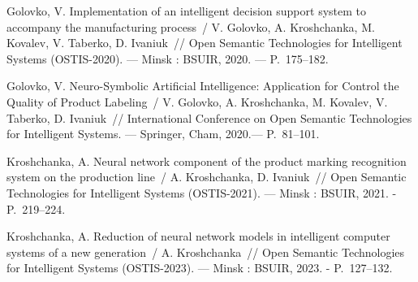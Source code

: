 Golovko, V. Implementation of an intelligent decision support system to accompany the manufacturing process~/ V. Golovko, A. Kroshchanka, M. Kovalev, V. Taberko, D. Ivaniuk~// 
 Open Semantic Technologies for Intelligent Systems (OSTIS-2020). ---
\newblock Minsk : BSUIR, 2020. ---
\newblock P.~175--182.

Golovko, V. Neuro-Symbolic Artificial Intelligence: Application for Control the Quality of Product Labeling~/ V. Golovko, A. Kroshchanka, M. Kovalev, V. Taberko, D. Ivaniuk~// 
 International Conference on Open Semantic Technologies for Intelligent Systems. ---
\newblock Springer, Cham, 2020.---
\newblock P.~81--101.

Kroshchanka, A. Neural network component of the product marking recognition system on the production line~/ A. Kroshchanka, D. Ivaniuk~// 
 Open Semantic Technologies for Intelligent Systems (OSTIS-2021). ---
\newblock Minsk : BSUIR, 2021. -
\newblock P.~219--224.



Kroshchanka, A. Reduction of neural network models in intelligent computer systems of a new generation~/ A. Kroshchanka~// 
 Open Semantic Technologies for Intelligent Systems (OSTIS-2023). ---
\newblock Minsk : BSUIR, 2023. -
\newblock P.~127--132.


